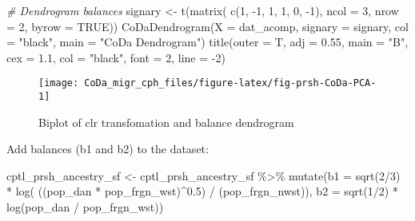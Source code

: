 \documentclass[
  12pt,
]{article}
\newenvironment{Shaded}{\begin{snugshade}}{\end{snugshade}}
\newcommand{\AttributeTok}[1]{\textcolor[rgb]{0.77,0.63,0.00}{#1}}
\newcommand{\CommentTok}[1]{\textcolor[rgb]{0.56,0.35,0.01}{\textit{#1}}}
\newcommand{\ConstantTok}[1]{\textcolor[rgb]{0.00,0.00,0.00}{#1}}
\newcommand{\DecValTok}[1]{\textcolor[rgb]{0.00,0.00,0.81}{#1}}
\newcommand{\FloatTok}[1]{\textcolor[rgb]{0.00,0.00,0.81}{#1}}
\newcommand{\FunctionTok}[1]{\textcolor[rgb]{0.00,0.00,0.00}{#1}}
\newcommand{\NormalTok}[1]{#1}
\newcommand{\OtherTok}[1]{\textcolor[rgb]{0.56,0.35,0.01}{#1}}
\newcommand{\SpecialCharTok}[1]{\textcolor[rgb]{0.00,0.00,0.00}{#1}}
\newcommand{\StringTok}[1]{\textcolor[rgb]{0.31,0.60,0.02}{#1}}
\begin{document}
\begin{Shaded}
\begin{Highlighting}[]
\CommentTok{\# Dendrogram balances}
\NormalTok{signary }\OtherTok{\textless{}{-}} \FunctionTok{t}\NormalTok{(}\FunctionTok{matrix}\NormalTok{( }\FunctionTok{c}\NormalTok{(}\DecValTok{1}\NormalTok{, }\SpecialCharTok{{-}}\DecValTok{1}\NormalTok{,  }\DecValTok{1}\NormalTok{,}
                       \DecValTok{1}\NormalTok{,  }\DecValTok{0}\NormalTok{, }\SpecialCharTok{{-}}\DecValTok{1}\NormalTok{),}
                     \AttributeTok{ncol =} \DecValTok{3}\NormalTok{,}
                     \AttributeTok{nrow =} \DecValTok{2}\NormalTok{,}
                     \AttributeTok{byrow =} \ConstantTok{TRUE}\NormalTok{))}
\FunctionTok{CoDaDendrogram}\NormalTok{(}\AttributeTok{X =}\NormalTok{ dat\_acomp,}
               \AttributeTok{signary =}\NormalTok{ signary,}
               \AttributeTok{col =} \StringTok{"black"}\NormalTok{,}
               \AttributeTok{main =} \StringTok{"CoDa Dendrogram"}\NormalTok{)}
\FunctionTok{title}\NormalTok{(}\AttributeTok{outer =}\NormalTok{ T,}
      \AttributeTok{adj =} \FloatTok{0.55}\NormalTok{,}
      \AttributeTok{main =} \StringTok{"B"}\NormalTok{,}
      \AttributeTok{cex =} \FloatTok{1.1}\NormalTok{,}
      \AttributeTok{col =} \StringTok{"black"}\NormalTok{,}
      \AttributeTok{font =} \DecValTok{2}\NormalTok{,}
      \AttributeTok{line =} \SpecialCharTok{{-}}\DecValTok{2}\NormalTok{)}
\end{Highlighting}
\end{Shaded}

\begin{figure}[H]

{\centering \texttt{[image: CoDa\_migr\_cph\_files/figure-latex/fig-prsh-CoDa-PCA-1]} 

}

\caption{Biplot of clr transfomation and balance dendrogram}\label{fig:fig-prsh-CoDa-PCA}
\end{figure}

Add balances (b1 and b2) to the dataset:

\begin{Shaded}
\begin{Highlighting}[]
\NormalTok{cptl\_prsh\_ancestry\_sf }\OtherTok{\textless{}{-}}\NormalTok{ cptl\_prsh\_ancestry\_sf }\SpecialCharTok{\%\textgreater{}\%}
  \FunctionTok{mutate}\NormalTok{(}\AttributeTok{b1 =} \FunctionTok{sqrt}\NormalTok{(}\DecValTok{2}\SpecialCharTok{/}\DecValTok{3}\NormalTok{) }\SpecialCharTok{*} \FunctionTok{log}\NormalTok{( ((pop\_dan }\SpecialCharTok{*}\NormalTok{ pop\_frgn\_wst)}\SpecialCharTok{\^{}}\FloatTok{0.5}\NormalTok{) }\SpecialCharTok{/}\NormalTok{ (pop\_frgn\_nwst)),}
         \AttributeTok{b2 =} \FunctionTok{sqrt}\NormalTok{(}\DecValTok{1}\SpecialCharTok{/}\DecValTok{2}\NormalTok{) }\SpecialCharTok{*} \FunctionTok{log}\NormalTok{(pop\_dan }\SpecialCharTok{/}\NormalTok{ pop\_frgn\_wst))}
\end{Highlighting}
\end{Shaded}
\end{document}
